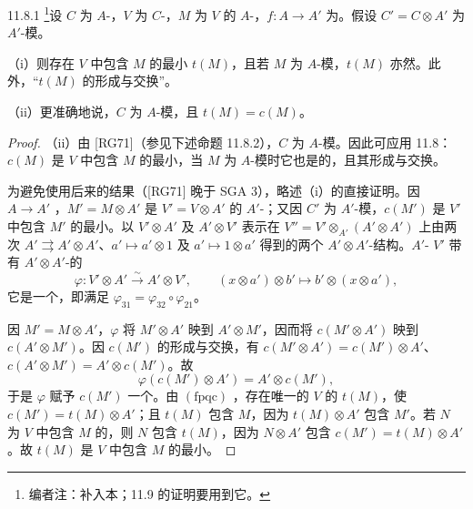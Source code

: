 \begin{SGAresult}{}{11.8.1}
\footnote{编者注：补入本；11.9 的证明要用到它。}设 $C$ 为 $A$-，$V$ 为 $C$-，$M$ 为 $V$ 的 $A$-，$f:A\to A'$ 为。假设 $C'=C\otimes A'$ 为 $A'$-模。

（i）则存在 $V$ 中包含 $M$ 的最小 $t(M)$，且若 $M$ 为 $A$-模，$t(M)$ 亦然。此外，“$t(M)$ 的形成与交换”。

（ii）更准确地说，$C$ 为 $A$-模，且 $t(M)=c(M)$。
\end{SGAresult}
\begin{proof}
（ii）由 [RG71]（参见下述命题 11.8.2），$C$ 为 $A$-模。因此可应用 11.8：$c(M)$ 是 $V$ 中包含 $M$ 的最小，当 $M$ 为 $A$-模时它也是的，且其形成与交换。

为避免使用后来的结果（[RG71] 晚于 SGA 3），略述（i）的直接证明。因 $A\to A'$ ，$M'=M\otimes A'$ 是 $V'=V\otimes A'$ 的 $A'$-；又因 $C'$ 为 $A'$-模，$c(M')$ 是 $V'$ 中包含 $M'$ 的最小。以 $V'\otimes A'$ 及 $A'\otimes V'$ 表示在 $V''=V'\otimes_{A'}(A'\otimes A')$ 上由两次 $A'\rightrightarrows A'\otimes A'$、$a'\mapsto a'\otimes1$ 及 $a'\mapsto1\otimes a'$ 得到的两个 $A'\otimes A'$-结构。$A'$- $V'$ 带有 $A'\otimes A'$-的
\[
\varphi:V'\otimes A'\xrightarrow{\sim}A'\otimes V',
\qquad(x\otimes a')\otimes b'\longmapsto b'\otimes(x\otimes a'),
\]
它是一个，即满足 $\varphi_{31}=\varphi_{32}\circ\varphi_{21}$。

因 $M'=M\otimes A'$，$\varphi$ 将 $M'\otimes A'$ 映到 $A'\otimes M'$，因而将 $c(M'\otimes A')$ 映到 $c(A'\otimes M')$。因 $c(M')$ 的形成与交换，有 $c(M'\otimes A')=c(M')\otimes A'$、$c(A'\otimes M')=A'\otimes c(M')$。故
\[
\varphi(c(M')\otimes A')=A'\otimes c(M'),
\]
于是 $\varphi$ 赋予 $c(M')$ 一个。由 $(\mathrm{fpqc})$ ，存在唯一的 $V$ 的 $t(M)$，使 $c(M')=t(M)\otimes A'$；且 $t(M)$ 包含 $M$，因为 $t(M)\otimes A'$ 包含 $M'$。若 $N$ 为 $V$ 中包含 $M$ 的，则 $N$ 包含 $t(M)$，因为 $N\otimes A'$ 包含 $c(M')=t(M)\otimes A'$。故 $t(M)$ 是 $V$ 中包含 $M$ 的最小。


\end{proof}

